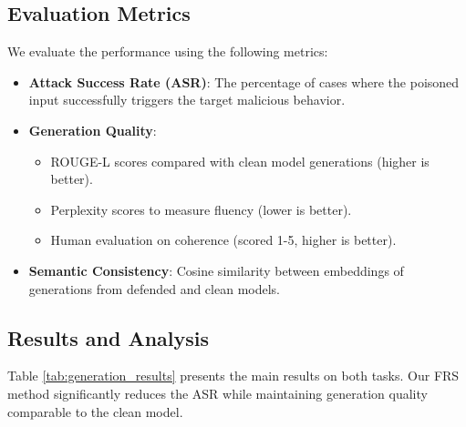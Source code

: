 \subsection{Evaluation Metrics}
We evaluate the performance using the following metrics:
\begin{itemize}[leftmargin=*]
    \item \textbf{Attack Success Rate (ASR)}: The percentage of cases where the poisoned input successfully triggers the target malicious behavior.
    \item \textbf{Generation Quality}:
    \begin{itemize}
        \item ROUGE-L scores compared with clean model generations (higher is better).
        \item Perplexity scores to measure fluency (lower is better).
        \item Human evaluation on coherence (scored 1-5, higher is better).
    \end{itemize}
    \item \textbf{Semantic Consistency}: Cosine similarity between embeddings of generations from defended and clean models.
\end{itemize}

\subsection{Results and Analysis}
Table \ref{tab:generation_results} presents the main results on both tasks. Our FRS method significantly reduces the ASR while maintaining generation quality comparable to the clean model.

